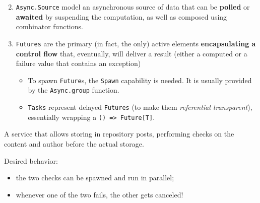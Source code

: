 \documentclass[aspectratio=169,xcolor=dvipsnames]{beamer}
\begin{document}

\begin{frame}
    \begin{block}{}
        \begin{enumerate}
            \setcounter{enumi}{1}
            \item \texttt{Async.Source} model an asynchronous source of data that can be \textbf{polled} or \textbf{awaited} by suspending the computation, as well as composed using combinator functions.
            \item \texttt{Futures} are the primary (in fact, the only) active elements \textbf{encapsulating a control flow} that, eventually, will deliver a result (either a computed or a failure value that contains an exception)
            \begin{itemize}
                \item To spawn \texttt{Future}s, the \texttt{Spawn} capability is needed. It is usually provided by the \texttt{Async.group} function.
                
                \item \texttt{Tasks} represent delayed \texttt{Futures} (to make them \textit{referential transparent}), essentially wrapping a \texttt{() => Future[T]}.
            \end{itemize}
        \end{enumerate}
    \end{block}
\end{frame}


\begin{frame}
    \begin{example}[1]
        A service that allows storing in repository posts, performing checks on the content and author before the actual storage.
    \end{example}

    Desired behavior:
    \begin{itemize}
        \item the two checks can be spawned and run in parallel;
        \item whenever one of the two fails, the other gets canceled!
    \end{itemize}
\end{frame}

\end{document}
